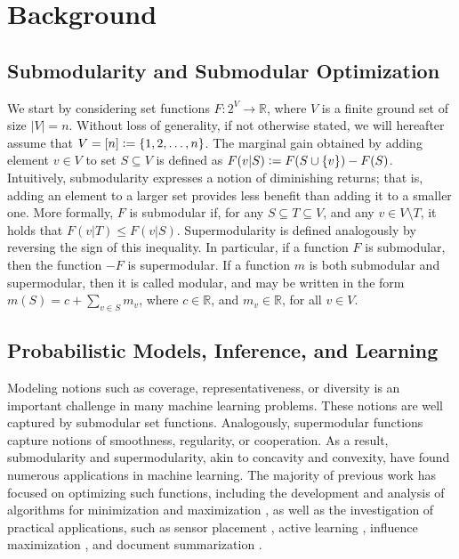 \chapter{Background} \label{ch:background}

\section{Submodularity and Submodular Optimization}
We start by considering set functions $F : 2^V \to \mathbb{R}$, where $V$ is a finite ground set of size $|V| = n$.
Without loss of generality, if not otherwise stated, we will hereafter assume that $V = [n] \vcentcolon= \{1, 2, \ldots,n\}$.
The marginal gain obtained by adding element $v \in V$ to set $S \subseteq V$ is defined as $F(v|S) \vcentcolon= F(S \cup \{v\}) - F(S)$.
Intuitively, submodularity expresses a notion of diminishing returns; that is, adding an element to a larger set provides less benefit than adding it to a smaller one.
More formally, $F$ is submodular if, for any $S \subseteq T \subseteq V$, and any $v \in V \setminus T$, it holds that $F(v|T) \leq F(v|S)$.
Supermodularity is defined analogously by reversing the sign of this inequality.
In particular, if a function $F$ is submodular, then the function $-F$ is supermodular.
If a function $m$ is both submodular and supermodular, then it is called modular, and may be written in the form $m(S) = c + \sum_{v \in S} m_v$, where $c \in \mathbb{R}$, and $m_v \in \mathbb{R}$, for all $v \in V$.

\section{Probabilistic Models, Inference, and Learning}


Modeling notions such as coverage, representativeness, or diversity is an important challenge in many machine learning problems.
These notions are well captured by submodular set functions.
Analogously, supermodular functions capture notions of smoothness, regularity, or cooperation. 
As a result, submodularity and supermodularity, akin to concavity and convexity, have found numerous applications in machine learning.
The majority of previous work has focused on optimizing such functions, including the development and analysis of algorithms for minimization \cite{fujishige05} and maximization \cite{nemhauser78,feige07}, as well as the investigation of practical applications, such as sensor placement \cite{krause06}, active learning \cite{golovin11}, influence maximization \cite{kempe03}, and document summarization \cite{lin11}.

